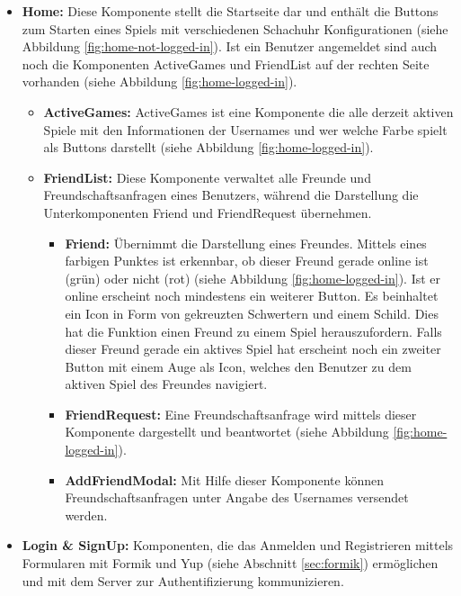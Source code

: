 \documentclass[a4paper,12pt]{report}
\begin{document}
\begin{itemize}
\begin{itemize}
\end{itemize}
\item \textbf{Home:} Diese Komponente stellt die Startseite dar und enthält die Buttons zum Starten eines Spiels mit verschiedenen Schachuhr Konfigurationen (siehe Abbildung \ref{fig:home-not-logged-in}). Ist ein Benutzer angemeldet sind auch noch die Komponenten ActiveGames und FriendList auf der rechten Seite vorhanden (siehe Abbildung \ref{fig:home-logged-in}).
\begin{itemize}
\item \textbf{ActiveGames:} ActiveGames ist eine Komponente die alle derzeit aktiven Spiele mit den Informationen der Usernames und wer welche Farbe spielt als Buttons darstellt (siehe Abbildung \ref{fig:home-logged-in}).
\item \textbf{FriendList:} Diese Komponente verwaltet alle Freunde und Freundschaftsanfragen eines Benutzers, während die Darstellung die Unterkomponenten Friend und FriendRequest übernehmen.
\begin{itemize}
\item \textbf{Friend:} Übernimmt die Darstellung eines Freundes. Mittels eines farbigen Punktes ist erkennbar, ob dieser Freund gerade online ist (grün) oder nicht (rot) (siehe Abbildung \ref{fig:home-logged-in}). Ist er online erscheint noch mindestens ein weiterer Button. Es beinhaltet ein Icon in Form von gekreuzten Schwertern und einem Schild. Dies hat die Funktion einen Freund zu einem Spiel herauszufordern. Falls dieser Freund gerade ein aktives Spiel hat erscheint noch ein zweiter Button mit einem Auge als Icon, welches den Benutzer zu dem aktiven Spiel des Freundes navigiert.
\item \textbf{FriendRequest:} Eine Freundschaftsanfrage wird mittels dieser Komponente dargestellt und beantwortet (siehe Abbildung \ref{fig:home-logged-in}).
\item \textbf{AddFriendModal:} Mit Hilfe dieser Komponente können Freundschaftsanfragen unter Angabe des Usernames versendet werden.
\end{itemize}
\end{itemize}
\item \textbf{Login \& SignUp:} Komponenten, die das Anmelden und Registrieren mittels Formularen mit Formik und Yup (siehe Abschnitt \ref{sec:formik}) ermöglichen und mit dem Server zur Authentifizierung kommunizieren. 

\end{itemize}
\end{document}
